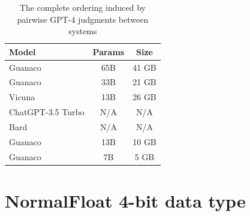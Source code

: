 \documentclass{article}
\begin{document}
\begin{table}[b]
\centering
\caption{Aggregated pairwise GPT-4 judgments between systems where the value of a cell at row $x$ and column $y$ is $\frac{\text{\# judgment $x$ is better than $y$} - \text{\# judgment $y$ is better than $x$}}{\text{total \# number of judgments}}$}
\label{tbl:pairwise}
\end{table}

\begin{table}[b]
\centering
\caption{The complete ordering induced by pairwise GPT-4 judgments between systems}
\label{tbl:order}
\begin{tabular}{lcc}\toprule
Model & Params & Size  \\ \midrule
Guanaco & 65B & 41 GB \\
Guanaco & 33B & 21 GB  \\
Vicuna & 13B & 26 GB \\
ChatGPT-3.5 Turbo & N/A & N/A  \\
Bard & N/A & N/A   \\
Guanaco & 13B & 10 GB   \\
Guanaco & 7B & 5 GB  \\\bottomrule
\end{tabular}
\end{table}

\section{NormalFloat 4-bit data type}
\label{app:nf4}
\end{document}
